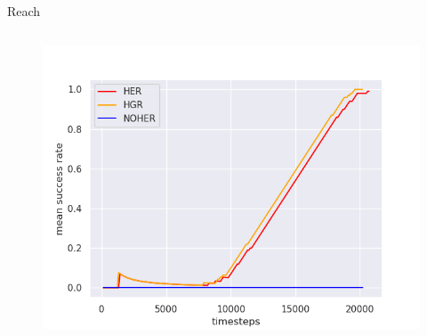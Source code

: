 \documentclass{beamer}
\begin{document}
      \begin{frame}[fragile]{Reach}
            \begin{columns}
                        \centering
                  \begin{figure}
                        \centering
                        \includegraphics[width=1.1\columnwidth]{figures/reach.png}
                  \end{figure}
            \end{columns}
      \end{frame}
\end{document}
